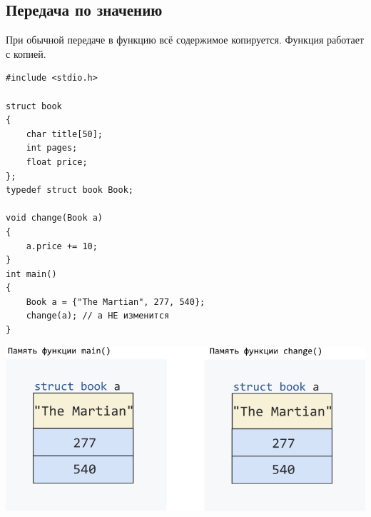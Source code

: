 \documentclass[10pt]{article}
\begin{document}
\subsection*{Передача по значению}
При обычной передаче в функцию всё содержимое копируется. Функция работает с копией.
\begin{multicols}{2}
\begin{lstlisting}
#include <stdio.h>

struct book 
{
    char title[50];
    int pages;
    float price;
};
typedef struct book Book;

void change(Book a) 
{
    a.price += 10;
}
int main()
{
    Book a = {"The Martian", 277, 540};
    change(a); // a НЕ изменится
}
\end{lstlisting}
\vfill\null
\columnbreak
\vspace*{3\baselineskip}
\begin{center}
\includegraphics[scale=0.5]{../images/structpassbyvalue.png}
\end{center}
\end{multicols}
\end{document}
